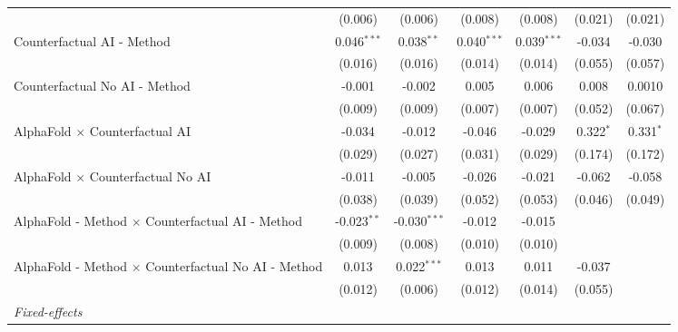 \begin{tabular}{lcccccc}
                                                              & (0.006)       & (0.006)        & (0.008)       & (0.008)       & (0.021)       & (0.021)\\   
   Counterfactual AI - Method                                 & 0.046$^{***}$ & 0.038$^{**}$   & 0.040$^{***}$ & 0.039$^{***}$ & -0.034        & -0.030\\   
                                                              & (0.016)       & (0.016)        & (0.014)       & (0.014)       & (0.055)       & (0.057)\\   
   Counterfactual No AI - Method                              & -0.001        & -0.002         & 0.005         & 0.006         & 0.008         & 0.0010\\   
                                                              & (0.009)       & (0.009)        & (0.007)       & (0.007)       & (0.052)       & (0.067)\\   
   AlphaFold $\times$ Counterfactual AI                       & -0.034        & -0.012         & -0.046        & -0.029        & 0.322$^{*}$   & 0.331$^{*}$\\   
                                                              & (0.029)       & (0.027)        & (0.031)       & (0.029)       & (0.174)       & (0.172)\\   
   AlphaFold $\times$ Counterfactual No AI                    & -0.011        & -0.005         & -0.026        & -0.021        & -0.062        & -0.058\\   
                                                              & (0.038)       & (0.039)        & (0.052)       & (0.053)       & (0.046)       & (0.049)\\   
   AlphaFold - Method $\times$ Counterfactual AI - Method     & -0.023$^{**}$ & -0.030$^{***}$ & -0.012        & -0.015        &               &   \\   
                                                              & (0.009)       & (0.008)        & (0.010)       & (0.010)       &               &   \\   
   AlphaFold - Method $\times$ Counterfactual No AI - Method  & 0.013         & 0.022$^{***}$  & 0.013         & 0.011         & -0.037        &   \\   
                                                              & (0.012)       & (0.006)        & (0.012)       & (0.014)       & (0.055)       &   \\   
   \midrule
   \emph{Fixed-effects}\\

\end{tabular}
